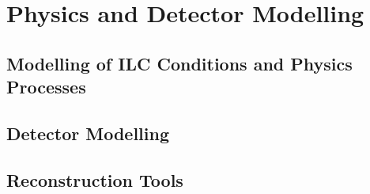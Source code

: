 \chapter{Physics and Detector Modelling}
\section{Modelling of ILC Conditions and Physics Processes}
\section{Detector Modelling}
\section{Reconstruction Tools}

